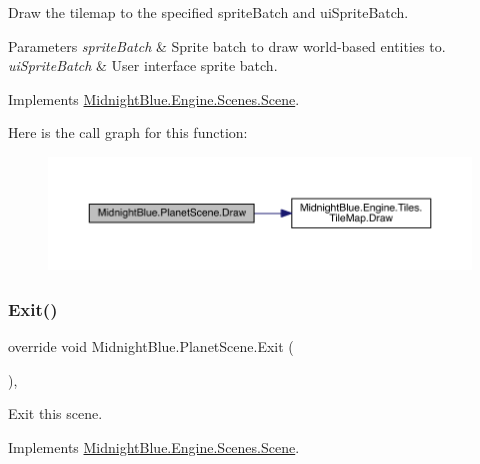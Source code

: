 Draw the tilemap to the specified sprite\+Batch and ui\+Sprite\+Batch. 


\begin{DoxyParams}{Parameters}
{\em sprite\+Batch} & Sprite batch to draw world-\/based entities to.\\
\hline
{\em ui\+Sprite\+Batch} & User interface sprite batch.\\
\hline
\end{DoxyParams}


Implements \hyperlink{class_midnight_blue_1_1_engine_1_1_scenes_1_1_scene_a6ec0b4be6c7dc226c9afd308e1fb3fd3}{Midnight\+Blue.\+Engine.\+Scenes.\+Scene}.

Here is the call graph for this function\+:
\nopagebreak
\begin{figure}[H]
\begin{center}
\leavevmode
\includegraphics[width=350pt]{class_midnight_blue_1_1_planet_scene_af22a201631e5f8c606ec3f7463635977_cgraph}
\end{center}
\end{figure}
\hypertarget{class_midnight_blue_1_1_planet_scene_af3aab90a13294493e1f2cd29b0fb60e6}{}\label{class_midnight_blue_1_1_planet_scene_af3aab90a13294493e1f2cd29b0fb60e6} 
\subsubsection{\texorpdfstring{Exit()}{Exit()}}
{\footnotesize\ttfamily override void Midnight\+Blue.\+Planet\+Scene.\+Exit (\begin{DoxyParamCaption}{ }\end{DoxyParamCaption})\hspace{0.3cm}{\ttfamily [inline]}, {\ttfamily [virtual]}}



Exit this scene. 



Implements \hyperlink{class_midnight_blue_1_1_engine_1_1_scenes_1_1_scene_adbf0f6d758df9fc5e20f24f327599e67}{Midnight\+Blue.\+Engine.\+Scenes.\+Scene}.

